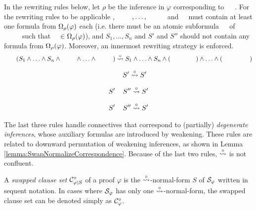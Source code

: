 \begin{definition}[$\normalizePlusTimesS$]
\label{definition:NormalizationPlusTimesSwap}
In the rewriting rules below, let $\rho$ be the inference in $\varphi$ corresponding to $\hF{\structtimes_{\rho}}$. For the rewriting rules to be applicable
%
%
, $\hF{S_{n+1}}, \ldots, \hF{S_{n+m}}$ and $\hF{S}$ must contain at least one formula from $\Omega_{\rho}(\varphi)$ each (i.e. there must be an atomic subformula $\hF{A}$ of $\hF{S_{n+k}}$ such that $\hF{A} \in \occInference{\varphi}{\rho}$), and $S_1, \ldots, S_n$ and $S'$ and $S''$ should not contain any formula from $\Omega_{\rho}(\varphi)$. Moreover, an innermost rewriting strategy is enforced.
$$
\hF{S} \hF{\structtimes_{\rho}} (S_1 \structplus \ldots \structplus S_n \structplus \hF{S_{n+1}} \structplus \ldots \structplus \hF{S_{n+m}}) \normalizePlusTimesS  S_1 \structplus \ldots \structplus S_n \structplus (\hF{S} \hF{\structtimes_{\rho}} \hF{S_{n+1}}) \structplus \ldots \structplus (\hF{S} \hF{\structtimes_{\rho}} \hF{S_{n+m}}) 
$$
\begin{multicols}{3}{
$$
\hF{S} \hF{\structplus_{\rho}} S' \normalizePlusTimesS  S'
$$

$$
S' \hF{\structtimes_{\rho}} S'' \normalizePlusTimesS  S'
$$

$$
S' \hF{\structplus_{\rho}} S'' \normalizePlusTimesS  S'
$$
}\end{multicols}

\end{definition}

\begin{remark}
The last three rules handle connectives that correspond to (partially) \emph{degenerate inferences}, whose auxiliary formulas are introduced by weakening. These rules are related to downward permutation of weakening inferences, as shown in Lemma \ref{lemma:SwapNormalizeCorrespondence}. Because of the last two rules, $\normalizePlusTimesS$ is not confluent.
\end{remark}


\begin{definition}
\label{definition:CutPertinentClauseSetSwap}
A \emph{swapped clause set} $\mathcal{C}^{\circ}_{\varphi|S}$ of a proof $\varphi$ is the $\normalizePlusTimesS$-normal-form $S$ of $\mathcal{S}_{\varphi}$ written in sequent notation. In cases where $\mathcal{S}_{\varphi}$ has only one $\normalizePlusTimesS$-normal-form, the swapped clause set can be denoted simply as $\mathcal{C}^{\circ}_{\varphi}$.
\end{definition}

